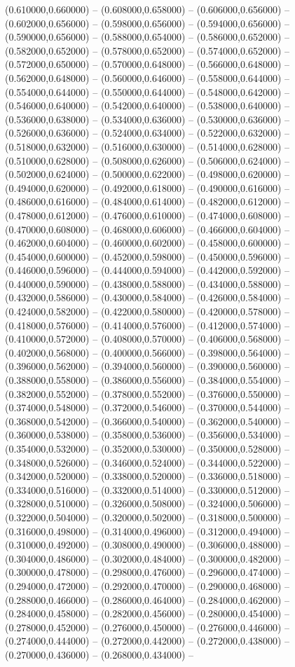    (0.610000,0.660000) -- (0.608000,0.658000) -- (0.606000,0.656000) -- (0.602000,0.656000) -- (0.598000,0.656000) -- (0.594000,0.656000) -- (0.590000,0.656000) -- (0.588000,0.654000) -- (0.586000,0.652000) -- (0.582000,0.652000) -- (0.578000,0.652000) -- (0.574000,0.652000) -- (0.572000,0.650000) -- (0.570000,0.648000) -- (0.566000,0.648000) -- (0.562000,0.648000) -- (0.560000,0.646000) -- (0.558000,0.644000) -- (0.554000,0.644000) -- (0.550000,0.644000) -- (0.548000,0.642000) -- (0.546000,0.640000) -- (0.542000,0.640000) -- (0.538000,0.640000) -- (0.536000,0.638000) -- (0.534000,0.636000) -- (0.530000,0.636000) -- (0.526000,0.636000) -- (0.524000,0.634000) -- (0.522000,0.632000) -- (0.518000,0.632000) -- (0.516000,0.630000) -- (0.514000,0.628000) -- (0.510000,0.628000) -- (0.508000,0.626000) -- (0.506000,0.624000) -- (0.502000,0.624000) -- (0.500000,0.622000) -- (0.498000,0.620000) -- (0.494000,0.620000) -- (0.492000,0.618000) -- (0.490000,0.616000) -- (0.486000,0.616000) -- (0.484000,0.614000) -- (0.482000,0.612000) -- (0.478000,0.612000) -- (0.476000,0.610000) -- (0.474000,0.608000) -- (0.470000,0.608000) -- (0.468000,0.606000) -- (0.466000,0.604000) -- (0.462000,0.604000) -- (0.460000,0.602000) -- (0.458000,0.600000) -- (0.454000,0.600000) -- (0.452000,0.598000) -- (0.450000,0.596000) -- (0.446000,0.596000) -- (0.444000,0.594000) -- (0.442000,0.592000) -- (0.440000,0.590000) -- (0.438000,0.588000) -- (0.434000,0.588000) -- (0.432000,0.586000) -- (0.430000,0.584000) -- (0.426000,0.584000) -- (0.424000,0.582000) -- (0.422000,0.580000) -- (0.420000,0.578000) -- (0.418000,0.576000) -- (0.414000,0.576000) -- (0.412000,0.574000) -- (0.410000,0.572000) -- (0.408000,0.570000) -- (0.406000,0.568000) -- (0.402000,0.568000) -- (0.400000,0.566000) -- (0.398000,0.564000) -- (0.396000,0.562000) -- (0.394000,0.560000) -- (0.390000,0.560000) -- (0.388000,0.558000) -- (0.386000,0.556000) -- (0.384000,0.554000) -- (0.382000,0.552000) -- (0.378000,0.552000) -- (0.376000,0.550000) -- (0.374000,0.548000) -- (0.372000,0.546000) -- (0.370000,0.544000) -- (0.368000,0.542000) -- (0.366000,0.540000) -- (0.362000,0.540000) -- (0.360000,0.538000) -- (0.358000,0.536000) -- (0.356000,0.534000) -- (0.354000,0.532000) -- (0.352000,0.530000) -- (0.350000,0.528000) -- (0.348000,0.526000) -- (0.346000,0.524000) -- (0.344000,0.522000) -- (0.342000,0.520000) -- (0.338000,0.520000) -- (0.336000,0.518000) -- (0.334000,0.516000) -- (0.332000,0.514000) -- (0.330000,0.512000) -- (0.328000,0.510000) -- (0.326000,0.508000) -- (0.324000,0.506000) -- (0.322000,0.504000) -- (0.320000,0.502000) -- (0.318000,0.500000) -- (0.316000,0.498000) -- (0.314000,0.496000) -- (0.312000,0.494000) -- (0.310000,0.492000) -- (0.308000,0.490000) -- (0.306000,0.488000) -- (0.304000,0.486000) -- (0.302000,0.484000) -- (0.300000,0.482000) -- (0.300000,0.478000) -- (0.298000,0.476000) -- (0.296000,0.474000) -- (0.294000,0.472000) -- (0.292000,0.470000) -- (0.290000,0.468000) -- (0.288000,0.466000) -- (0.286000,0.464000) -- (0.284000,0.462000) -- (0.284000,0.458000) -- (0.282000,0.456000) -- (0.280000,0.454000) -- (0.278000,0.452000) -- (0.276000,0.450000) -- (0.276000,0.446000) -- (0.274000,0.444000) -- (0.272000,0.442000) -- (0.272000,0.438000) -- (0.270000,0.436000) -- (0.268000,0.434000) -- 